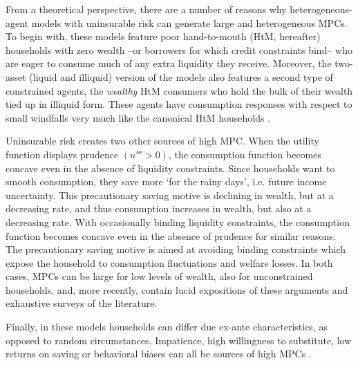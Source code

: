 From a theoretical perspective, there are a number of reasons why heterogeneous-agent models with uninsurable risk can generate large and heterogeneous MPCs. To begin with, these models feature poor hand-to-mouth (HtM, hereafter) households with zero wealth --or borrowers for which credit constraints bind-- who are eager to consume much of any extra liquidity they receive. Moreover, the two-asset (liquid and illiquid) version of the models also features a second type of constrained agents, the \textit{wealthy} HtM consumers who hold the bulk of their wealth tied up in illiquid form. These agents have consumption responses with respect to small windfalls very much like the canonical HtM households \citep{kaplan2014model,kaplan2014wealthy}.

Uninsurable risk creates two other sources of high MPC. When the utility function displays prudence $(u'''>0)$, the consumption function becomes concave even in the absence of liquidity constraints. Since households want to smooth consumption, they save more `for the rainy days', i.e. future income uncertainty. This precautionary saving motive is declining in wealth, but at a decreasing rate, and thus consumption increases in wealth, but also at a decreasing rate. With occasionally binding liquidity constraints, the consumption function becomes concave even in the absence of prudence for similar reasons. The precautionary saving motive is aimed at avoiding binding constraints which expose the household to consumption fluctuations and welfare losses. In both cases, MPCs can be large for low levels of wealth, also for unconstrained households. \citet{carroll2001theory} and, more recently, \citet{carroll2021liquidity} contain lucid expositions of these arguments and exhaustive surveys of the literature.

Finally, in these models households can differ due ex-ante characteristics, as opposed to random circumstances. Impatience, high willingness to substitute, low returns on saving or behavioral biases can all be sources of high MPCs \citep{aguiar2020hand,carroll2017distribution}. 


